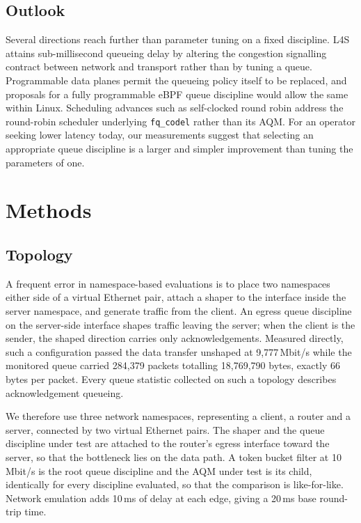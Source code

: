 \subsection*{Outlook}

Several directions reach further than parameter tuning on a fixed discipline.
L4S\cite{rfc9330,rfc9332} attains sub-millisecond queueing delay by altering
the congestion signalling contract between network and transport rather than by
tuning a queue. Programmable data planes permit the queueing policy itself to
be replaced\cite{desired2024}, and proposals for a fully programmable eBPF
queue discipline\cite{ebpfqdisc2023} would allow the same within
Linux. Scheduling advances such as self-clocked round robin\cite{scrr2025}
address the round-robin scheduler underlying \texttt{fq\_codel} rather than its
AQM. For an operator seeking lower latency today, our measurements suggest that
selecting an appropriate queue discipline is a larger and simpler improvement
than tuning the parameters of one.

\section*{Methods}

\subsection*{Topology}

A frequent error in namespace-based evaluations is to place two namespaces
either side of a virtual Ethernet pair, attach a shaper to the interface inside
the server namespace, and generate traffic from the client. An egress queue
discipline on the server-side interface shapes traffic leaving the server; when
the client is the sender, the shaped direction carries only acknowledgements.
Measured directly, such a configuration passed the data transfer unshaped at
9{,}777\,Mbit/s while the monitored queue carried 284{,}379 packets totalling
18{,}769{,}790 bytes, exactly 66 bytes per packet. Every queue statistic
collected on such a topology describes acknowledgement queueing.

We therefore use three network namespaces, representing a client, a router and
a server, connected by two virtual Ethernet pairs. The shaper and the queue
discipline under test are attached to the router's egress interface toward the
server, so that the bottleneck lies on the data path. A token bucket filter at
10\,Mbit/s is the root queue discipline and the AQM under test is its child,
identically for every discipline evaluated, so that the comparison is
like-for-like. Network emulation adds 10\,ms of delay at each edge, giving a
20\,ms base round-trip time.

